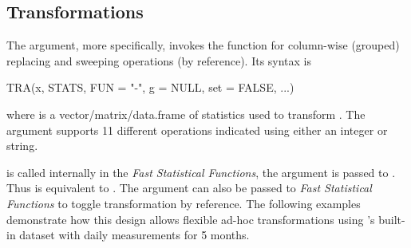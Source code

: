 \documentclass[article]{jss}
\newcommand{\fct}[1]{\code{#1()}}
\begin{document}
\subsection{Transformations}
The  argument, more specifically, invokes the \fct{TRA} function for column-wise (grouped) replacing and sweeping operations (by reference). Its syntax is
\begin{Code}
TRA(x, STATS, FUN = "-", g = NULL, set = FALSE, ...)
\end{Code}
where  is a vector/matrix/data.frame of statistics used to transform . The  argument supports 11 different operations indicated using either an integer or string.
%
\begin{table}[h!]
\end{table}
%
 is called internally in the \emph{Fast Statistical Functions}, the  argument is passed to . Thus  is equivalent to . The  argument can also be passed to \emph{Fast Statistical Functions} to toggle transformation by reference. The following examples demonstrate how this design allows flexible ad-hoc transformations using 's built-in  dataset with daily measurements for 5 months.
\end{document}
